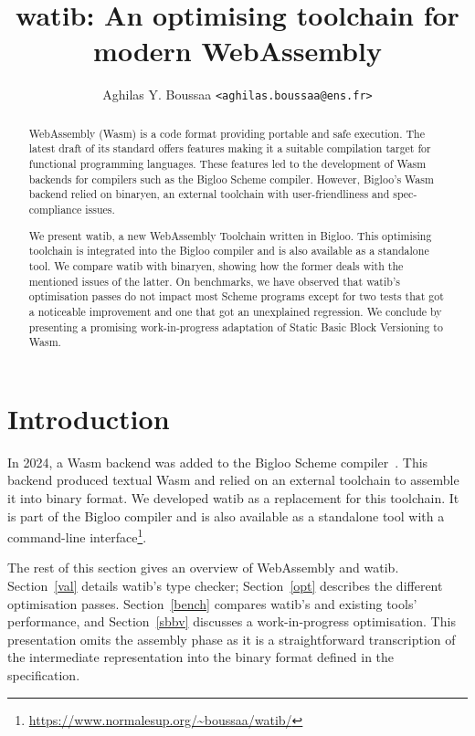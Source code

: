 \documentclass[a4paper,11pt]{article}
\author{Aghilas Y. Boussaa \texttt{<aghilas.boussaa@ens.fr>}}
\title{\textsf{watib}: An optimising toolchain for modern WebAssembly}
\begin{document}
\sloppy
\maketitle
\begin{abstract}
  WebAssembly (Wasm) is a code format providing portable and safe execution.
  The latest draft of its standard offers features making it a suitable
  compilation target for functional programming languages. These features led to
  the development of Wasm backends for compilers such as the Bigloo Scheme
  compiler. However, Bigloo's Wasm backend relied on binaryen, an external
  toolchain with user-friendliness and spec-compliance issues.

  We present \textsf{watib}, a new WebAssembly Toolchain written in Bigloo. This
  optimising toolchain is integrated into the Bigloo compiler and is also
  available as a standalone tool. We compare \textsf{watib} with binaryen,
  showing how the former deals with the mentioned issues of the latter. On
  benchmarks, we have observed that \textsf{watib}'s optimisation passes do not
  impact most Scheme programs except for two tests that got a noticeable
  improvement and one that got an unexplained regression. We conclude by
  presenting a promising work-in-progress adaptation of Static Basic Block
  Versioning to Wasm.
\end{abstract}

\section{Introduction}
In 2024, a Wasm backend was added to the Bigloo Scheme compiler~\cite{Bigloo}.
This backend produced textual Wasm and relied on an external toolchain to
assemble it into binary format. We developed \textsf{watib} as a replacement for
this toolchain. It is part of the Bigloo compiler and is also available as a
standalone tool with a command-line
interface\footnote{\url{https://www.normalesup.org/~boussaa/watib/}}.

The rest of this section gives an overview of WebAssembly and \textsf{watib}.
Section~\ref{val} details \textsf{watib}'s type checker; Section~\ref{opt}
describes the different optimisation passes. Section~\ref{bench} compares
\textsf{watib}'s and existing tools' performance, and Section~\ref{sbbv}
discusses a work-in-progress optimisation. This presentation omits the assembly
phase as it is a straightforward transcription of the intermediate
representation into the binary format defined in the specification.
\end{document}
